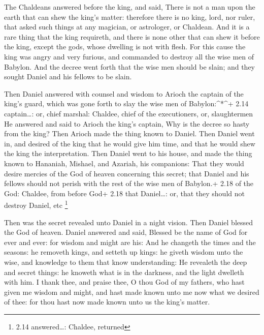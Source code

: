  The Chaldeans answered before the king, and said, There is
not a man upon the earth that can shew the king's matter: therefore
there is no king, lord, nor ruler, that asked such things at any
magician, or astrologer, or Chaldean.  And it is a rare
thing that the king requireth, and there is none other that can shew it
before the king, except the gods, whose dwelling is not with flesh.
 For this cause the king was angry and very furious, and
commanded to destroy all the wise men of Babylon.  And the
decree went forth that the wise men should be slain; and they sought
Daniel and his fellows to be slain.

 Then Daniel answered with counsel and wisdom to Arioch the
captain of the king's guard, which was gone forth to slay the wise men
of Babylon:\^{}*\^{}+ 2.14 captain\ldots: or, chief marshal: Chaldee,
chief of the executioners, or, slaughtermen  He answered
and said to Arioch the king's captain, Why is the decree so hasty from
the king? Then Arioch made the thing known to Daniel.  Then
Daniel went in, and desired of the king that he would give him time, and
that he would shew the king the interpretation.  Then
Daniel went to his house, and made the thing known to Hananiah, Mishael,
and Azariah, his companions:  That they would desire
mercies of the God of heaven concerning this secret; that Daniel and his
fellows should not perish with the rest of the wise men of Babylon.+
2.18 of the God: Chaldee, from before God+ 2.18 that Daniel\ldots: or,
that they should not destroy Daniel, etc \footnote{2.14 answered\ldots:
  Chaldee, returned}

 Then was the secret revealed unto Daniel in a night
vision. Then Daniel blessed the God of heaven.  Daniel
answered and said, Blessed be the name of God for ever and ever: for
wisdom and might are his:  And he changeth the times and
the seasons: he removeth kings, and setteth up kings: he giveth wisdom
unto the wise, and knowledge to them that know understanding:
 He revealeth the deep and secret things: he knoweth what
is in the darkness, and the light dwelleth with him.  I
thank thee, and praise thee, O thou God of my fathers, who hast given me
wisdom and might, and hast made known unto me now what we desired of
thee: for thou hast now made known unto us the king's matter.

